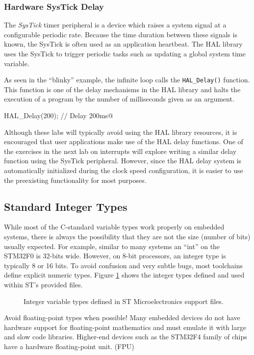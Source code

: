 \documentclass[11pt,fleqn]{book} %
\makeatletter
\newcommand{\ilcode}[1]{
    \smallskip
    \colorbox{gray!20!white}{
        \centering
        \parbox{\linewidth-2\fboxsep}{
            \lstinline@#1@
        }
    }
}
\newcommand{\code}[3]{
    \begin{figure}[]
        \colorbox{gray!20!white}{
            \parbox{\linewidth-2\fboxsep} {
                \centering 
                
            }
        }
        \caption{#2}
        \label{#3}
    \end{figure}
}
\makeatother
\begin{document}
\subsubsection{Hardware SysTick Delay}

The \textit{SysTick} timer peripheral is a device which raises a system signal at a configurable periodic rate. Because the time duration between these signals is known, the SysTick is often used as an application heartbeat. The HAL library uses the SysTick to trigger periodic tasks such as updating a global system time variable. 

As seen in the ``blinky'' example, the infinite loop calls the \texttt{HAL\_Delay()} function. This function is one of the delay mechanisms in the HAL library and halts the execution of a program by the number of milliseconds given as an argument. 

\ilcode{HAL_Delay(200); // Delay 200ms}

Although these labs will typically avoid using the HAL library resources, it is encouraged that user applications make use of the HAL delay functions. One of the exercises in the next lab on interrupts will explore writing a similar delay function using the SysTick peripheral. However, since the HAL delay system is automatically initialized during the clock speed configuration, it is easier to use the preexisting functionality for most purposes. 

\subsection{Standard Integer Types}

While most of the C-standard variable types work properly on embedded systems, there is always the possibility that they are not the size (number of bits) usually expected. For example, similar to many systems an ``int'' on the STM32F0 is 32-bits wide. However, on 8-bit processors, an integer type is typically 8 or 16 bits. To avoid confusion and very subtle bugs, most toolchains define explicit numeric types. Figure \ref{types} shows the integer types defined and used within ST's provided files.

\code{./files/types.h}{Integer variable types defined in ST Microelectronics support files.}{types}
\begin{warning}
    Avoid floating-point types when possible! Many embedded devices do not have hardware support for floating-point mathematics and must emulate it with large and slow code libraries. Higher-end devices such as the STM32F4 family of chips have a hardware floating-point unit. (FPU) 
\end{warning}
\end{document}
